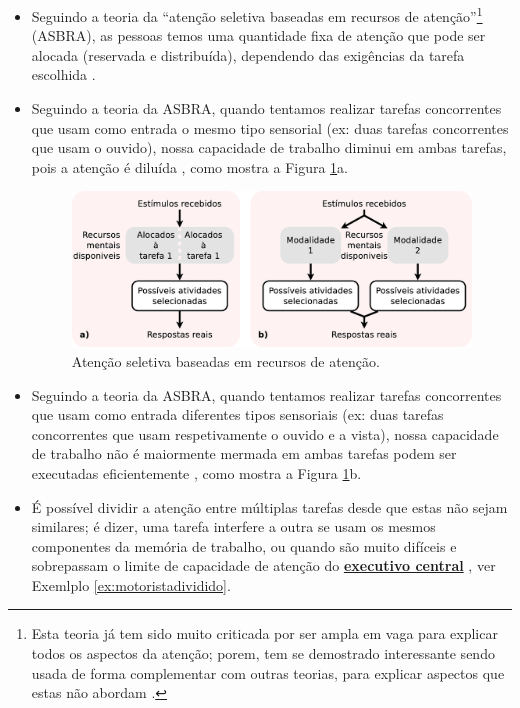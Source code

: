 \begin{itemize}
\item Seguindo a teoria da 
``atenção seletiva baseadas em recursos de atenção''\footnote{\label{footnote:ASBRA} Esta
teoria já tem sido muito criticada por ser ampla em vaga para explicar todos os aspectos da atenção;
porem, tem se demostrado interessante sendo usada de forma complementar com outras teorias,
para explicar aspectos que estas não abordam \cite[pp. 139-140]{sternbergpsicologia}.} (ASBRA),
as pessoas temos uma quantidade fixa de atenção que pode ser alocada (reservada e distribuída),
dependendo das exigências da tarefa escolhida
\cite[pp. 139]{sternbergpsicologia}  \cite{navon1979economy}.

\item Seguindo a teoria da ASBRA, 
quando tentamos realizar  tarefas concorrentes que usam como entrada o mesmo tipo sensorial 
(ex: duas tarefas concorrentes que usam o ouvido),
nossa capacidade de trabalho diminui em ambas tarefas, pois a atenção é diluída 
\cite[pp. 139]{sternbergpsicologia}  \cite{navon1979economy},
como mostra a  Figura \ref{fig:memory-attention}a.
\begin{figure}[!h]
  \centering
    \includegraphics[width=\textwidth]{chapters/cap-learning/memory-attention.eps}
\caption{Atenção seletiva baseadas em recursos de atenção.}
\label{fig:memory-attention}
\end{figure}

\item Seguindo a teoria da ASBRA, 
quando tentamos realizar  tarefas concorrentes que usam como entrada diferentes tipos sensoriais 
(ex: duas tarefas concorrentes que usam respetivamente o ouvido e a vista),
nossa capacidade de trabalho não é maiormente mermada em ambas tarefas podem ser executadas eficientemente 
\cite[pp. 139, 140]{sternbergpsicologia} \cite{navon1979economy},
como mostra a  Figura \ref{fig:memory-attention}b.

\item É possível dividir a atenção entre múltiplas tarefas desde que estas não sejam similares;
é dizer, uma tarefa interfere a outra se usam os mesmos componentes da memória de trabalho,
ou quando são muito difíceis e sobrepassam o limite de capacidade de atenção do 
\hyperref[reflabel:executivocentral]{\textbf{executivo central}} 
\cite[pp. 108]{pake2019psicologia} \cite[pp. 190]{eysenck2017manual}, 
ver Exemlplo \ref{ex:motoristadividido}.


\end{itemize}
